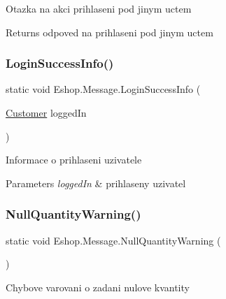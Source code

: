 Otazka na akci prihlaseni pod jinym uctem 

\begin{DoxyReturn}{Returns}
odpoved na prihlaseni pod jinym uctem
\end{DoxyReturn}
\mbox{\label{class_eshop_1_1_message_aa6688b49480807d22a54941fd213fd97}} 
\subsubsection{\texorpdfstring{LoginSuccessInfo()}{LoginSuccessInfo()}}
{\footnotesize\ttfamily static void Eshop.\+Message.\+Login\+Success\+Info (\begin{DoxyParamCaption}\item[{\mbox{\hyperlink{class_eshop_1_1_customer}{Customer}}}]{logged\+In }\end{DoxyParamCaption})\hspace{0.3cm}{\ttfamily [static]}}



Informace o prihlaseni uzivatele 


\begin{DoxyParams}{Parameters}
{\em logged\+In} & prihlaseny uzivatel\\
\hline
\end{DoxyParams}
\mbox{\label{class_eshop_1_1_message_a22381f9edb7f12ad6f3ec13db3c19409}} 
\subsubsection{\texorpdfstring{NullQuantityWarning()}{NullQuantityWarning()}}
{\footnotesize\ttfamily static void Eshop.\+Message.\+Null\+Quantity\+Warning (\begin{DoxyParamCaption}{ }\end{DoxyParamCaption})\hspace{0.3cm}{\ttfamily [static]}}



Chybove varovani o zadani nulove kvantity 

\mbox{\label{class_eshop_1_1_message_a4e2447f5c0bab152ff87165a878b0682}} 

